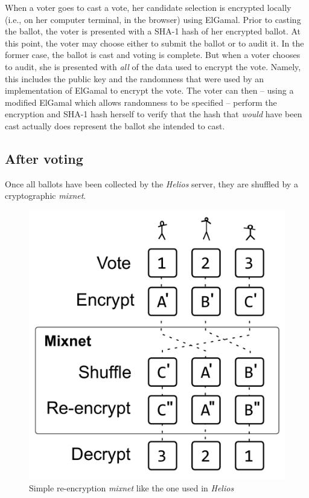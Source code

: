 \documentclass[10pt,twocolumn]{article}
\newcommand{\term}[1]{\textit{#1}}
\begin{document}
When a voter goes to cast a vote, her candidate selection is encrypted locally (i.e., on her
computer terminal, in the browser) using ElGamal. Prior to casting the ballot, the voter is
presented with a SHA-1 hash of her encrypted ballot. At this point, the voter may choose either
to submit the ballot or to audit it. In the former case, the ballot is cast and voting is
complete. But when a voter chooses to audit, she is presented with \emph{all} of the data
used to encrypt the vote. Namely, this includes the public key and the randomness that were used
by an implementation of ElGamal to encrypt the vote. The voter can then -- using a modified ElGamal
which allows randomness to be specified -- perform the encryption and SHA-1 hash herself
to verify that the hash that \emph{would} have been cast actually does represent the ballot she
intended to cast.

\subsection{After voting}

Once all ballots have been collected by the \term{Helios} server, they are shuffled by a cryptographic
\term{mixnet}.

\begin{figure}
	\center
	\includegraphics[width=0.8\columnwidth]{images/include/mixnet.pdf}
	\caption{Simple re-encryption \term{mixnet} like the one used in \term{Helios}}
	\label{fig:mixnet}
\end{figure}
\end{document}
